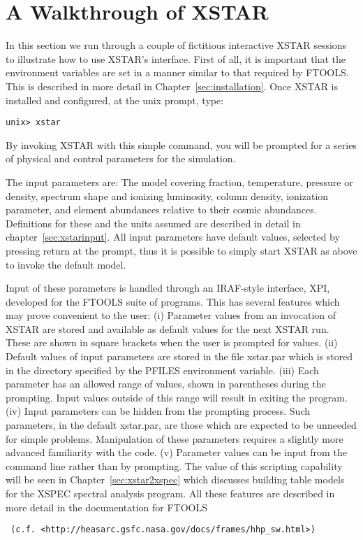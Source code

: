 \chapter{A Walkthrough of XSTAR}
\label{sec:walkthrough}

In this section we run through a couple of fictitious interactive XSTAR sessions 
to illustrate how to use XSTAR's interface.  First of all, it 
is important that the environment variables are set in a manner similar to that
required by FTOOLS.  This is described in more detail in Chapter~\ref{sec:installation}.  
Once XSTAR is installed and configured, at the unix prompt, type:

\begin{verbatim}
unix> xstar
\end{verbatim}

By invoking XSTAR with this simple command, you will be prompted for 
a series of physical and control parameters for the simulation.

The input parameters are: The model covering fraction, temperature, 
pressure or density, spectrum shape and ionizing
luminosity, column density, ionization parameter,
and element abundances relative to their cosmic 
abundances.  Definitions for these and the units assumed 
are described in detail in chapter~\ref{sec:xstarinput}.  
All input parameters have default values, selected by pressing return at 
the prompt, thus it is possible to simply start XSTAR as above to invoke 
the default model.

Input of these parameters is handled through an IRAF-style interface, XPI, 
developed for the FTOOLS suite of programs.  This has several features
which may prove convenient to the user: (i) Parameter values from 
an invocation of XSTAR are stored and available as default values
for the next XSTAR run.  These are shown in square brackets 
when the user is prompted for values. (ii) Default values of input 
parameters are stored in the file xstar.par which is stored in the 
directory specified by the PFILES environment variable. (iii) Each 
parameter has an allowed range of values, shown in parentheses 
during the prompting.  Input values outside of this range will result
in exiting the program.  (iv) Input parameters can be hidden from the 
prompting process.  Such parameters, in the default xstar.par, are 
those which are expected to be unneeded for simple problems.  
Manipulation of these parameters requires a slightly more advanced 
familiarity with the code. (v) Parameter values can be input from the 
command line rather than by prompting.  
The value of this scripting capability will be seen in 
Chapter~\ref{sec:xstar2xspec} which discusses building table models 
for the XSPEC spectral analysis program.  All these features 
are described in more detail in the documentation for FTOOLS
\begin{verbatim} (c.f. <http://heasarc.gsfc.nasa.gov/docs/frames/hhp_sw.html>)
\end{verbatim}

